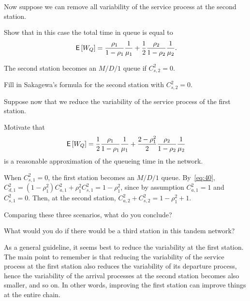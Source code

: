 Now suppose we can remove all variability of the service process at the second station. 

\begin{exercise}
Show that in this case the total time in queue is equal to
\begin{equation*}
 \,\mathsf{E}\left[W_Q\right]= \frac{\rho_1}{1-\rho_1} \frac1{\mu_1} +
 \frac12\frac{\rho_2}{1-\rho_2} \frac1{\mu_2}.
\end{equation*}
\begin{hint}
 The second station becomes an $M/D/1$ queue if $C_{s,2}^2=0$. 
\end{hint}
\begin{solution}
Fill in Sakagewa's formula for the second station with $C_{s,2}^2 = 0$. 
\end{solution}
\end{exercise}

Suppose now that we reduce the variability of the service process of the first station.
\begin{exercise}
Motivate that 
\begin{equation*}
 \,\mathsf{E}\left[W_Q\right]= \frac12\frac{\rho_1}{1-\rho_1} \frac1{\mu_1} +
 \frac{2-\rho_1^2}2\frac{\rho_2}{1-\rho_2} \frac1{\mu_2}
\end{equation*}
is a reasonable approximation of the queueing time in the network.
\begin{solution}
  When $C_{s,1}^2=0$, the first station becomes an $M/D/1$ queue.
  By~\cref{eq:40}, $C_{d,1}^2 = (1-\rho_1^2)C_{a,1}^2 + \rho_1^2 C_{s,1}^2= 1-\rho_1^2$, since by assumption $C_{a,1}^2=1$ and $C_{s,1}^2=0$. Then,
  at the second station, $C_{a,2}^2 + C_{s,2}^2= 1-\rho_1^2 + 1$.
\end{solution}
\end{exercise}

\begin{exercise}
 Comparing these three scenarios,  what do you conclude?
\begin{hint}
 What would you do if there would be a third station in this tandem network?
\end{hint}
\begin{solution}
  As a general guideline, it seems best to reduce the variability at the first station.
  The main point to remember is that reducing the variability of the service process at the first station also reduces the variability of its departure process, hence the variability of the arrival processes at the second station becomes also smaller, and so on.  In other words, improving the first station can improve things at the entire chain.
\end{solution}
\end{exercise}







